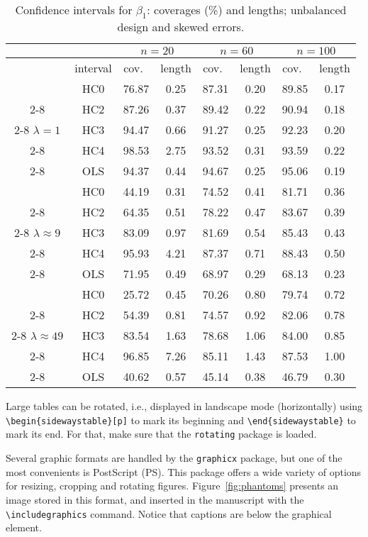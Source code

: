 \documentclass[12pt,twoside,reqno,final]{bjps}
\theoremstyle{plain}
\numberwithin{equation}{section}
\begin{document}
\begin{table}[hbt]
\caption{{Confidence intervals for $\beta_1$: 
coverages (\%) and lengths; unbalanced design and skewed errors.}}\label{Ta:beta1erroexp}
\begin{tabular}{|c|c|c|c|c|c|c|c|}\hline
& & \multicolumn{2}{|c|}{$n=20$}& \multicolumn{2}{|c|}{$n=60$}&
\multicolumn{2}{|c|}{$n=100$} \\\hline & interval&cov.\ &length
&cov.\ &length &cov.\ &length \\\hline
 &HC0&76.87&0.25&87.31&0.20&89.85&0.17\\\cline{2-8}
 &HC2&87.26&0.37&89.42&0.22&90.94&0.18\\\cline{2-8}
 $\lambda=1$ &HC3&94.47&0.66&91.27&0.25&92.23&0.20\\\cline{2-8}
 &HC4&98.53&2.75&93.52&0.31&93.59&0.22\\\cline{2-8}
 &OLS&94.37&0.44&94.67&0.25&95.06&0.19\\\hline \hline
 &HC0&44.19&0.31&74.52&0.41&81.71&0.36\\\cline{2-8}
 &HC2&64.35&0.51&78.22&0.47&83.67&0.39\\\cline{2-8}
 $\lambda \approx 9$&HC3&83.09&0.97&81.69&0.54&85.43&0.43\\\cline{2-8}
 &HC4&95.93&4.21&87.37&0.71&88.43&0.50\\\cline{2-8}
 &OLS&71.95&0.49&68.97&0.29&68.13&0.23\\\hline \hline
 &HC0&25.72&0.45&70.26&0.80&79.74&0.72\\\cline{2-8}
 &HC2&54.39&0.81&74.57&0.92&82.06&0.78\\\cline{2-8}
 $\lambda \approx 49$&HC3&83.54&1.63&78.68&1.06&84.00&0.85\\\cline{2-8}
&HC4&96.85&7.26&85.11&1.43&87.53&1.00\\\cline{2-8}
&OLS&40.62&0.57&45.14&0.38&46.79&0.30\\\hline
\end{tabular}
\end{table}

Large tables can be rotated, i.e., displayed in landscape mode 
(horizontally) 
using \verb+\begin{sidewaystable}[p]+ to mark its beginning and 
\verb+\end{sidewaystable}+ to mark its end. 
For that, make sure that the \verb+rotating+ package is loaded. 

Several graphic formats are handled by the \verb+graphicx+ package, but one of the most convenients is PostScript (PS).
This package offers a wide variety of options for resizing, cropping and rotating figures.
Figure~\ref{fig:phantoms} presents an image stored in this format, and inserted in the manuscript with the \verb+\includegraphics+ command.
Notice that captions are below the graphical element.
\end{document}

